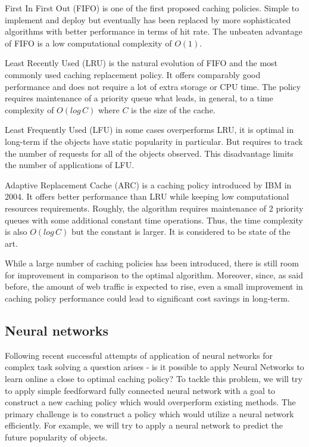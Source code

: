 First In First Out (FIFO) is one of the first proposed caching policies. Simple to implement and deploy but eventually has been replaced by more sophisticated algorithms with better performance in terms of hit rate. The unbeaten advantage of FIFO is a low computational complexity of $ O(1) $.

Least Recently Used (LRU) is the natural evolution of FIFO and the most commonly used caching replacement policy. It offers comparably good performance and does not require a lot of extra storage or CPU time. The policy requires maintenance of a priority queue what leads, in general, to a time complexity of $ O(log\,C) $ where $C$ is the size of the cache.

Least Frequently Used (LFU) in some cases overperforms LRU, it is optimal in long-term if the objects have static popularity in particular. But requires to track the number of requests for all of the objects observed. This disadvantage limits the number of applications of LFU.

Adaptive Replacement Cache (ARC) \cite{3} is a caching policy introduced by IBM \cite{4} in 2004. It offers better performance than LRU while keeping low computational resources requirements. Roughly, the algorithm requires maintenance of 2 priority queues with some additional constant time operations. Thus, the time complexity is also $ O(log\,C) $ but the constant is larger. It is considered to be state of the art.

While a large number of caching policies has been introduced, there is still room for improvement in comparison to the optimal algorithm. Moreover, since, as said before, the amount of web traffic is expected to rise, even a small improvement in caching policy performance could lead to significant cost savings in long-term.

\subsection{Neural networks} \label{neural_networks_intro}

Following recent successful attempts of application of neural networks \cite{6} for complex task solving \cite{7,8,9} a question arises - is it possible to apply Neural Networks to learn online a close to optimal caching policy? To tackle this problem, we will try to apply simple feedforward fully connected neural network with a goal to construct a new caching policy which would overperform existing methods. The primary challenge is to construct a policy which would utilize a neural network efficiently. For example, we will try to apply a neural network to predict the future popularity of objects.

